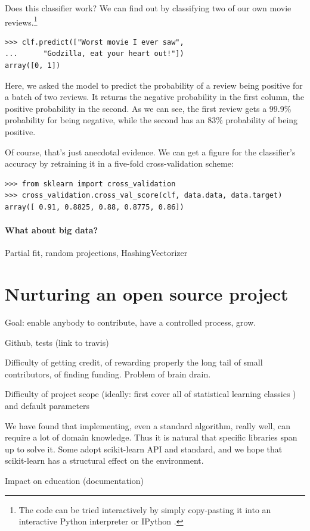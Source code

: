 \documentclass[a4paper]{article}
\begin{document}
Does this classifier work?
We can find out by classifying two of our own movie reviews.\footnote{
  The code can be tried interactively by simply copy-pasting it
  into an interactive Python interpreter or IPython \cite{perez2007ipython}.
}

\begin{lstlisting}
>>> clf.predict(["Worst movie I ever saw",
...      "Godzilla, eat your heart out!"])
array([0, 1])
\end{lstlisting}

Here, we asked the model to predict the probability of a review being positive
for a batch of two reviews. It returns the negative probability in the first
column, the positive probability in the second.
As we can see, the first review gets a 99.9\% probability for being negative,
while the second has an 83\% probability of being positive.

Of course, that's just anecdotal evidence. We can get a figure for the
classifier's accuracy by retraining it in a five-fold cross-validation scheme:

\begin{lstlisting}
>>> from sklearn import cross_validation
>>> cross_validation.cross_val_score(clf, data.data, data.target)
array([ 0.91, 0.8825, 0.88, 0.8775, 0.86])
\end{lstlisting}

\paragraph{What about big data?}
%
Partial fit, random projections, HashingVectorizer

\section{Nurturing an open source project}

Goal: enable anybody to contribute, have a controlled process, grow.

Github, tests (link to travis)

Difficulty of getting credit, of rewarding properly the long tail of small
contributors, of finding funding. Problem of brain drain.

Difficulty of project scope (ideally: first cover all of statistical
learning classics \cite{elemstatlearn}) and default parameters

We have found that implementing, even a standard algorithm, really well,
can require a lot of domain knowledge. Thus it is natural that specific
libraries span up to solve it. Some adopt scikit-learn API and standard,
and we hope that scikit-learn has a structural effect on the environment.

Impact on education (documentation)



\end{document}
